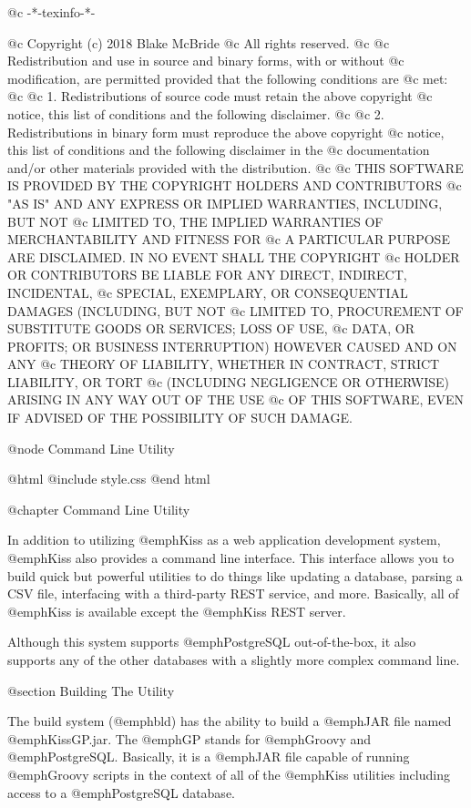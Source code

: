 @c -*-texinfo-*-

@c  Copyright (c) 2018 Blake McBride
@c  All rights reserved.
@c
@c  Redistribution and use in source and binary forms, with or without
@c  modification, are permitted provided that the following conditions are
@c  met:
@c
@c  1. Redistributions of source code must retain the above copyright
@c  notice, this list of conditions and the following disclaimer.
@c
@c  2. Redistributions in binary form must reproduce the above copyright
@c  notice, this list of conditions and the following disclaimer in the
@c  documentation and/or other materials provided with the distribution.
@c
@c  THIS SOFTWARE IS PROVIDED BY THE COPYRIGHT HOLDERS AND CONTRIBUTORS
@c  "AS IS" AND ANY EXPRESS OR IMPLIED WARRANTIES, INCLUDING, BUT NOT
@c  LIMITED TO, THE IMPLIED WARRANTIES OF MERCHANTABILITY AND FITNESS FOR
@c  A PARTICULAR PURPOSE ARE DISCLAIMED. IN NO EVENT SHALL THE COPYRIGHT
@c  HOLDER OR CONTRIBUTORS BE LIABLE FOR ANY DIRECT, INDIRECT, INCIDENTAL,
@c  SPECIAL, EXEMPLARY, OR CONSEQUENTIAL DAMAGES (INCLUDING, BUT NOT
@c  LIMITED TO, PROCUREMENT OF SUBSTITUTE GOODS OR SERVICES; LOSS OF USE,
@c  DATA, OR PROFITS; OR BUSINESS INTERRUPTION) HOWEVER CAUSED AND ON ANY
@c  THEORY OF LIABILITY, WHETHER IN CONTRACT, STRICT LIABILITY, OR TORT
@c  (INCLUDING NEGLIGENCE OR OTHERWISE) ARISING IN ANY WAY OUT OF THE USE
@c  OF THIS SOFTWARE, EVEN IF ADVISED OF THE POSSIBILITY OF SUCH DAMAGE.

@node Command Line Utility

@html
@include style.css
@end html

@chapter Command Line Utility

In addition to utilizing @emph{Kiss} as a web application development
system, @emph{Kiss} also provides a command line interface.  This interface
allows you to build quick but powerful utilities to do things like updating
a database, parsing a CSV file, interfacing with a third-party REST service,
and more.  Basically, all of @emph{Kiss} is available except the @emph{Kiss}
REST server.

Although this system supports @emph{PostgreSQL} out-of-the-box, it
also supports any of the other databases with a slightly more complex
command line.

@section Building The Utility

The build system (@emph{bld}) has the ability to build a @emph{JAR}
file named @emph{KissGP.jar}.  The @emph{GP} stands for @emph{Groovy}
and @emph{PostgreSQL}.  Basically, it is a @emph{JAR} file capable of
running @emph{Groovy} scripts in the context of all of the @emph{Kiss}
utilities including access to a @emph{PostgreSQL} database.

